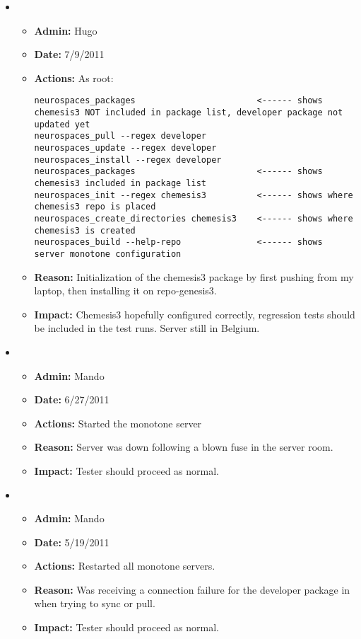 \documentclass[12pt]{article}
\begin{document}
\begin{itemize}
\item
  \begin{itemize}
  \item[] {\bf Admin:} Hugo
  \item[] {\bf Date:} 7/9/2011 
  \item[] {\bf Actions:} As root:
\begin{verbatim}
neurospaces_packages                        <------ shows chemesis3 NOT included in package list, developer package not updated yet
neurospaces_pull --regex developer
neurospaces_update --regex developer
neurospaces_install --regex developer
neurospaces_packages                        <------ shows chemesis3 included in package list
neurospaces_init --regex chemesis3          <------ shows where chemesis3 repo is placed
neurospaces_create_directories chemesis3    <------ shows where chemesis3 is created
neurospaces_build --help-repo               <------ shows server monotone configuration
\end{verbatim}
  \item[] {\bf Reason:} Initialization of the chemesis3 package by
    first pushing from my laptop, then installing it on repo-genesis3.
  \item[] {\bf Impact:} Chemesis3 hopefully configured correctly,
    regression tests should be included in the test runs.  Server
    still in Belgium.
  \end{itemize}


\item
  \begin{itemize}
  \item[] {\bf Admin:} Mando
  \item[] {\bf Date:} 6/27/2011
  \item[] {\bf Actions:} Started the monotone server
  \item[] {\bf Reason:} Server was down following a blown fuse in the
    server room.
  \item[] {\bf Impact:} Tester should proceed as normal.
  \end{itemize}
  
  
\item
  \begin{itemize}
  \item[] {\bf Admin:} Mando
  \item[] {\bf Date:} 5/19/2011
  \item[] {\bf Actions:} Restarted all monotone servers.
  \item[] {\bf Reason:} Was receiving a connection failure for the
    developer package in when trying to sync or pull.
  \item[] {\bf Impact:} Tester should proceed as normal.
  \end{itemize}
  

\end{itemize}
\end{document}
